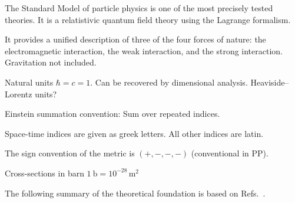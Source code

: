 The Standard Model of particle physics is one of the most precisely tested
theories. It is a relatistivic quantum field theory using the Lagrange
formalism.

It provides a unified description of three of the four forces of nature: the
electromagnetic interaction, the weak interaction, and the strong
interaction. Gravitation not included.

Natural units $\hbar = c = 1$. Can be recovered by dimensional
analysis. Heaviside--Lorentz units?

Einstein summation convention: Sum over repeated indices.

Space-time indices are given as greek letters. All other indices are latin.

The sign convention of the metric is $(+, -, -, -)$ (conventional in PP).

Cross-sections in barn $\SI{1}{\barn} = 10^{-28}\,\si{\metre\squared}$


The following summary of the theoretical foundation is based on
Refs.~\cite{Halzen:1984mc,Thomson:2013zua,Djouadi:2005gi}.

